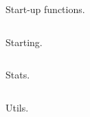 \documentclass[10pt,twocolumn,landscape]{book}
\begin{document}
\begin{figure}[!t]
\caption{Start-up functions.}\label{start-up}
\inputminted{lua}{luas/Start-up.lua}
\end{figure}

\begin{figure}[!t]
\caption{Starting.}\label{starting}
\inputminted{lua}{luas/Starting.lua}
\end{figure}

\begin{figure}[!t]
\caption{Stats.}\label{stats}
\inputminted{lua}{luas/Stats.lua}
\end{figure}

\begin{figure}[!t]
\caption{Utils.}\label{utils}
\inputminted{lua}{luas/Utilities.lua}
\end{figure}
\end{document}
